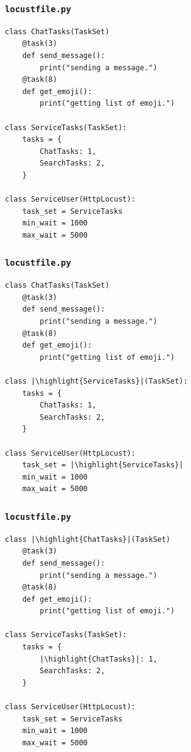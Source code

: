\documentclass{beamer}
\begin{document}
\begin{frame}[fragile]
\frametitle{\texttt{locustfile.py}}
\begin{verbatim}
class ChatTasks(TaskSet)
    @task(3)
    def send_message():
        print("sending a message.")
    @task(8)
    def get_emoji():
        print("getting list of emoji.")

class ServiceTasks(TaskSet):
    tasks = {
        ChatTasks: 1,
        SearchTasks: 2,
    }

class ServiceUser(HttpLocust):
    task_set = ServiceTasks
    min_wait = 1000
    max_wait = 5000
\end{verbatim}
\end{frame}


\begin{frame}[fragile]
\frametitle{\texttt{locustfile.py}}
\begin{verbatim}
class ChatTasks(TaskSet)
    @task(3)
    def send_message():
        print("sending a message.")
    @task(8)
    def get_emoji():
        print("getting list of emoji.")

class |\highlight{ServiceTasks}|(TaskSet):
    tasks = {
        ChatTasks: 1,
        SearchTasks: 2,
    }

class ServiceUser(HttpLocust):
    task_set = |\highlight{ServiceTasks}|
    min_wait = 1000
    max_wait = 5000
\end{verbatim}
\end{frame}


\begin{frame}[fragile]
\frametitle{\texttt{locustfile.py}}
\begin{verbatim}
class |\highlight{ChatTasks}|(TaskSet)
    @task(3)
    def send_message():
        print("sending a message.")
    @task(8)
    def get_emoji():
        print("getting list of emoji.")

class ServiceTasks(TaskSet):
    tasks = {
        |\highlight{ChatTasks}|: 1,
        SearchTasks: 2,
    }

class ServiceUser(HttpLocust):
    task_set = ServiceTasks
    min_wait = 1000
    max_wait = 5000
\end{verbatim}
\end{frame}
\end{document}
